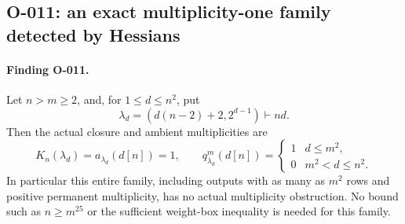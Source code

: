 \subsection{O-011: an exact multiplicity-one family detected by Hessians}

\paragraph{Finding O-011.}
Let $n>m\geq2$, and, for $1\leq d\leq n^2$, put
\[
              \lambda_d=(d(n-2)+2,2^{d-1})\vdash nd.
\]
Then the actual closure and ambient multiplicities are
\[
 K_n(\lambda_d)=a_{\lambda_d}(d[n])=1,\qquad
 q^m_{\lambda_d}(d[n])=
 \begin{cases}1&d\leq m^2,\\0&m^2<d\leq n^2.\end{cases}       \tag{O-011.1}
\]
In particular this entire family, including outputs with as many
as $m^2$ rows and positive permanent multiplicity, has no actual
multiplicity obstruction. No bound such as $n\geq m^{25}$ or
the sufficient weight-box inequality is needed for this family.

